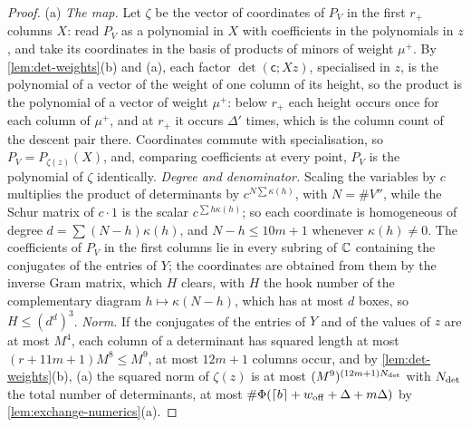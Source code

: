 \begin{proof}
(a) \emph{The map.} Let $\zeta$ be the vector of coordinates of $P_V$ in the first $r_+$ columns $X$: read $P_V$ as a polynomial in $X$ with coefficients in the polynomials in $z$, and take its coordinates in the basis of products of
minors of weight $\mu^+$. By \cref{lem:det-weights}(b) and (a), each factor $\det(\mathsf c;Xz)$, specialised in $z$, is the polynomial of a vector of the weight of one column of its height, so the product is the polynomial of a vector of
weight $\mu^+$: below $r_+$ each height occurs once for each column of $\mu^+$, and at $r_+$ it occurs $\Delta'$ times, which is the column count of the descent pair there. Coordinates commute with specialisation, so $P_V=P_{\zeta(z)}(X)$, and,
comparing coefficients at every point, $P_V$ is the polynomial of $\zeta$ identically. \emph{Degree and denominator.} Scaling the variables by $c$ multiplies the product of determinants by $c^{N\sum\kappa(h)}$, with $N=\#V''$, while the
Schur matrix of $c\cdot1$ is the scalar $c^{\sum h\kappa(h)}$; so each coordinate is homogeneous of degree $d=\sum(N-h)\kappa(h)$, and $N-h\le10m+1$ whenever $\kappa(h)\ne0$. The coefficients of $P_V$ in the first columns lie in every subring of $\mathbb{C}$
containing the conjugates of the entries of $Y$; the coordinates are obtained from them by the inverse Gram matrix, which $H$ clears, with $H$ the hook number of the complementary diagram $h\mapsto\kappa(N-h)$, which has at most $d$ boxes,
so $H\le(d^d)^3$. \emph{Norm.} If the conjugates of the entries of $Y$ and of the values of $z$ are at most $M^4$, each column of a determinant has squared length at most $(r+11m+1)M^8\le M^9$, at most $12m+1$ columns occur, and by
\cref{lem:det-weights}(b), (a) the squared norm of $\zeta(z)$ is at most $(M^9)^{(12m+1)N_{\rm det}}$ with $N_{\rm det}$ the total number of determinants, at most $\#\Phi(\lceil b\rceil+w_{\rm off}+\Delta+m\Delta)$ by \cref{lem:exchange-numerics}(a).


\end{proof}
